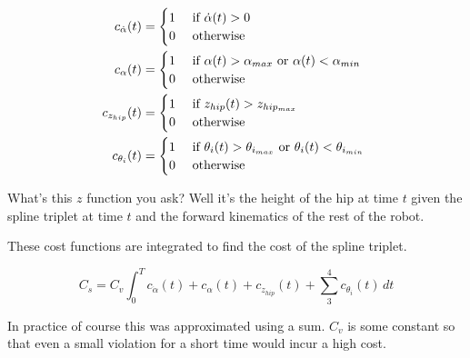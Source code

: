 \begin{align} 
	c_{\dot \alpha}(t) &=
  	\begin{cases} 
    	\hfill 1 \hfill & \text{ if $\dot \alpha(t) > 0$ } \\
      \hfill 0 \hfill & \text{ otherwise }
  	\end{cases} \\
  c_{\alpha}(t) &=
  	\begin{cases} 
    	\hfill 1 \hfill & \text{ if $\alpha(t) > \alpha_{max}$ or $\alpha(t) < \alpha_{min}$ } \\
      \hfill 0 \hfill & \text{ otherwise }
  	\end{cases} \\
	c_{z_{hip}}(t) &=
  	\begin{cases} 
    	\hfill 1 \hfill & \text{ if $z_{hip}(t) > z_{hip_{max}}$ } \\
      \hfill 0 \hfill & \text{ otherwise }
  	\end{cases} \\
	c_{\theta_i}(t) &=
  	\begin{cases} 
  		\hfill 1 \hfill & \text{ if $\theta_i (t) > \theta_{i_{max}}$ or $\theta_i (t) < \theta_{i_{min}}$ } \\
    	\hfill 0 \hfill & \text{ otherwise }
  	\end{cases}
\end{align}

What's this $z$ function you ask? Well it's the height of the hip at time $t$ given the spline triplet at time $t$ and the forward kinematics of the rest of the robot.

These cost functions are integrated to find the cost of the spline triplet.

\begin{equation}
	C_s = C_v \int_0^T c_{\dot \alpha}(t) + c_{\alpha}(t) + c_{z_{hip}}(t) + \sum_3^4 c_{\theta_i}(t) \, dt
\end{equation}

In practice of course this was approximated using a sum.
$C_v$ is some constant so that even a small violation for a short time would incur a high cost.



